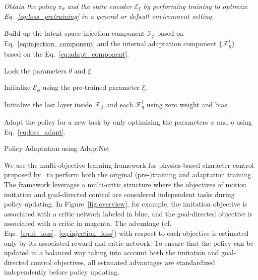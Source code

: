 \begin{algorithm}[t]
\emph{Obtain the policy $\pi_{\theta}$ and the state encoder $\mathcal{E}_\xi$ by performing training to optimize  Eq.~\ref{eq:loss_pretraining} in a general or default environment setting.} %

\nl Build up the latent space injection component $\mathcal{I}_\phi$ based on Eq.~\ref{eq:injection_component} and the internal adaptation component $\{\mathcal{F}_\eta^i\}$ based on the Eq.~\ref{eq:adapt_component}.

\nl Lock the parameters $\theta$ and $\xi$.

\nl Initialize $\mathcal{E}_\phi$ using the pre-trained parameter $\xi$.

\nl Initialize the last layer inside $\mathcal{F}_\phi$ and each $\mathcal{F}_\eta^i$ using zero weight and bias.

\nl Adapt the policy for a new task by only optimizing the parameters $\phi$ and $\eta$ using Eq.~\ref{eq:loss_adapt}.
\caption{Policy Adaptation using AdaptNet}
\label{alg:alg}
\end{algorithm}

We use the multi-objective learning framework  for physics-based character control proposed by~\citet{composite} to perform both
the original (pre-)training and adaptation training. 
The framework leverages a 
multi-critic structure where the 
objectives of motion imitation and goal-directed control are considered independent tasks during policy updating.  
In Figure~\ref{fig:overview}, for example,
the imitation objective is associated with a critic network labeled in blue, and the goal-directed objective is associated with a critic in magenta.
The advantage (cf. Eqs.~\ref{eq:rl_loss},~\ref{eq:injection_loss}) with respect to each objective is estimated only by its associated reward and critic network.
To ensure that the policy can be updated in a balanced way taking into account both the imitation and goal-directed control objectives, 
all estimated advantages are standardized independently before policy updating. 

